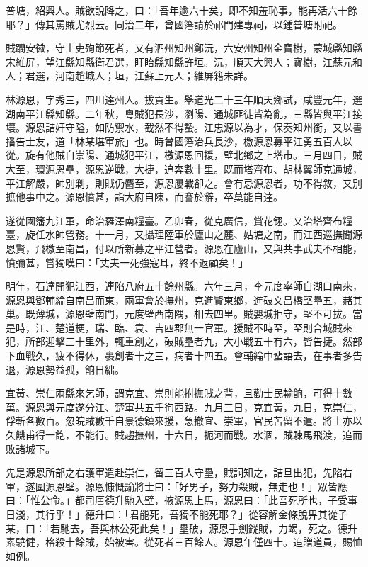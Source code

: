\begin{pinyinscope}
普塘，紹興人。賊欲說降之，曰：「吾年逾六十矣，即不知羞恥事，能再活六十餘耶？」傳其罵賊尤烈云。同治二年，曾國籓請於祁門建專祠，以鍾普塘附祀。

賊躪安徽，守土吏殉節死者，又有泗州知州鄭沅，六安州知州金寶樹，蒙城縣知縣宋維屏，望江縣知縣衛君選，盱眙縣知縣許垣。沅，順天大興人；寶樹，江蘇元和人；君選，河南趙城人；垣，江蘇上元人；維屏籍未詳。

林源恩，字秀三，四川達州人。拔貢生。舉道光二十三年順天鄉試，咸豐元年，選湖南平江縣知縣。二年秋，粵賊犯長沙，瀏陽、通城匪徒皆為亂，三縣皆與平江接壤。源恩詰奸守隘，如防禦水，截然不得蟄。江忠源以為才，保奏知州銜，又以書播告士友，道「林某堪軍旅」也。時曾國籓治兵長沙，檄源恩募平江勇五百人以從。旋有他賊自崇陽、通城犯平江，檄源恩回援，壁北鄉之上塔市。三月四日，賊大至，環源恩壘，源恩逆戰，大捷，追奔數十里。既而塔齊布、胡林翼師克通城，平江解嚴，師別剿，則賊仍麕至，源恩屢戰卻之。會有忌源恩者，功不得敘，又別摭他事中之。源恩憤甚，詣大府自陳，而謇於辭，卒莫能自達。

遂從國籓九江軍，命治羅澤南糧臺。乙卯春，從克廣信，賞花翎。又治塔齊布糧臺，旋任水師營務。十一月，又攝理陸軍於廬山之麓、姑塘之南，而江西巡撫聞源恩賢，飛檄至南昌，付以所新募之平江營者。源恩在廬山，又與共事武夫不相能，憤彌甚，嘗獨嘆曰：「丈夫一死強寇耳，終不返顧矣！」

明年，石達開犯江西，連陷八府五十餘州縣。六年三月，李元度率師自湖口南來，源恩與鄧輔綸自南昌而東，兩軍會於撫州，克進賢東鄉，進破文昌橋堅壘五，赭其巢。既薄城，源恩壁南門，元度壁西南隅，相去四里。賊嬰城拒守，堅不可拔。當是時，江、楚道梗，瑞、臨、袁、吉四郡無一官軍。援賊不時至，至則合城賊來犯，所部迎擊三十里外，輒重創之，破賊壘者九，大小戰五十有六，皆告捷。然部下血戰久，疲不得休，裹創者十之三，病者十四五。會輔綸中蜚語去，在事者多告退，源恩勢益孤，餉日絀。

宜黃、崇仁兩縣來乞師，謂克宜、崇則能拊撫賊之背，且勸士民輸餉，可得十數萬。源恩與元度遂分江、楚軍共五千徇西路。九月三日，克宜黃，九日，克崇仁，俘斬各數百。忽皖賊數千自景德鎮來援，急撤宜、崇軍，官民苦留不遣。將士亦以久饑甫得一飽，不能行。賊趨撫州，十六日，扼河而戰。水涸，賊駷馬飛渡，追而敗諸城下。

先是源恩所部之右護軍遣赴崇仁，留三百人守壘，賊詗知之，詰旦出犯，先陷右軍，遂圍源恩壁。源恩慷慨諭將士曰：「好男子，努力殺賊，無走也！」眾皆應曰：「惟公命。」都司唐德升馳入壁，掖源恩上馬，源恩曰：「此吾死所也，子受事日淺，其行乎！」德升曰：「君能死，吾獨不能死耶？」從容解金條脫畀其從子某，曰：「若馳去，吾與林公死此矣！」壘破，源恩手劍鏦賊，力竭，死之。德升素驍健，格殺十餘賊，始被害。從死者三百餘人。源恩年僅四十。追贈道員，賜恤如例。


\end{pinyinscope}
